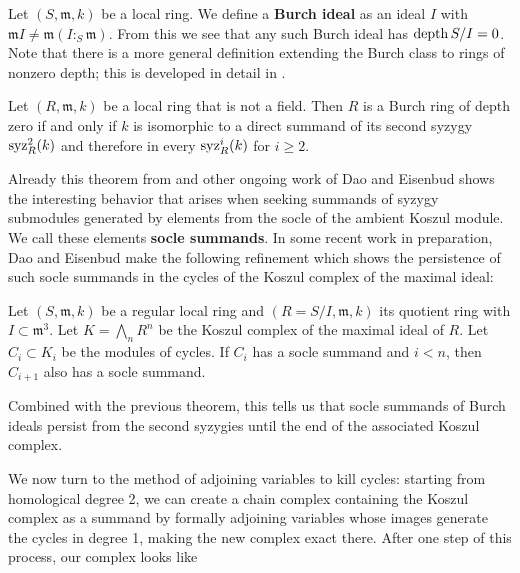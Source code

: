 \documentclass[twoside,12pt, leqno]{amsart}
\begin{document}
\begin{definition}
Let $(S, \mathfrak{m}, k)$ be a local ring. We define a \textbf{Burch ideal} as an ideal $I$ with $\mathfrak{m} I \neq \mathfrak{m}(I :_S \mathfrak{m})$. From this we see that any such Burch ideal has $\operatorname{depth} S / I = 0$. Note that there is a more general definition extending the Burch class to rings of nonzero depth; this is developed in detail in \cite{DE23}.

\end{definition}

\begin{theorem}
	Let $(R, \mathfrak{m}, k)$ be a local ring that is not a field. Then $R$ is a Burch ring of depth zero if and only if $k$ is isomorphic to a direct summand of its second syzygy $\operatorname{syz}_R^2 (k)$ and therefore in every $\operatorname{syz}_R^i (k)$ for $i \geqslant 2$.
\end{theorem}

Already this theorem from \cite{DKT20} and other ongoing work of Dao and Eisenbud shows the interesting behavior that arises when seeking summands of syzygy submodules generated by elements from the socle of the ambient Koszul module. We call these elements \textbf{socle summands}. In some recent work in preparation, Dao and Eisenbud make the following refinement which shows the persistence of such socle summands in the cycles of the Koszul complex of the maximal ideal:

\begin{theorem}
	Let $(S, \mathfrak{m}, k)$ be a regular local ring and $(R = S / I, \mathfrak{m}, k)$ its quotient ring with $I \subset \mathfrak{m}^3$. Let $K = \bigwedge_n R^n$ be the Koszul complex of the maximal ideal of $R$. Let $C_i \subset K_i$ be the modules of cycles. If $C_i$ has a socle summand and $i < n$, then $C_{i+1}$ also has a socle summand.
\end{theorem}

Combined with the previous theorem, this tells us that socle summands of Burch ideals persist from the second syzygies until the end of the associated Koszul complex. 

We now turn to the method of adjoining variables to kill cycles: starting from homological degree 2, we can create a chain complex containing the Koszul complex as a summand by formally adjoining variables whose images generate the cycles in degree 1, making the new complex exact there. After one step of this process, our complex looks like
\end{document}

